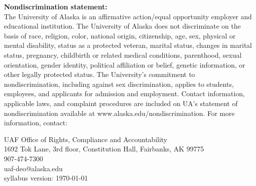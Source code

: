 \documentclass[12pt]{article}
\renewcommand{\emph}[1]{\textsf{\textbf{#1}}}
\newcommand{\localhead}[1]{\par\smallskip\textbf{#1}\nobreak\\}%
\def\subheading#1{\localhead{\emph{#1}}}
\begin{document}
\subheading{Nondiscrimination statement:} The University of Alaska is an affirmative action/equal opportunity employer and educational institution. The University of Alaska does not discriminate on the basis of race, religion, color, national origin, citizenship, age, sex, physical or mental disability, status as a protected veteran, marital status, changes in marital status, pregnancy, childbirth or related medical conditions, parenthood, sexual orientation, gender identity, political affiliation or belief, genetic information, or other legally protected status. The University's commitment to nondiscrimination, including against sex discrimination, applies to students, employees, and applicants for admission and employment. Contact information, applicable laws, and complaint procedures are included on UA's statement of nondiscrimination available at www.alaska.edu/nondiscrimination. For more information, contact: 

UAF Office of Rights, Compliance and Accountability\\
1692 Tok Lane, 3rd floor, Constitution Hall, Fairbanks, AK  99775\\
907-474-7300\\
uaf-deo@alaska.edu\\

 \scriptsize syllabus version: \today \normalsize
\end{document}
